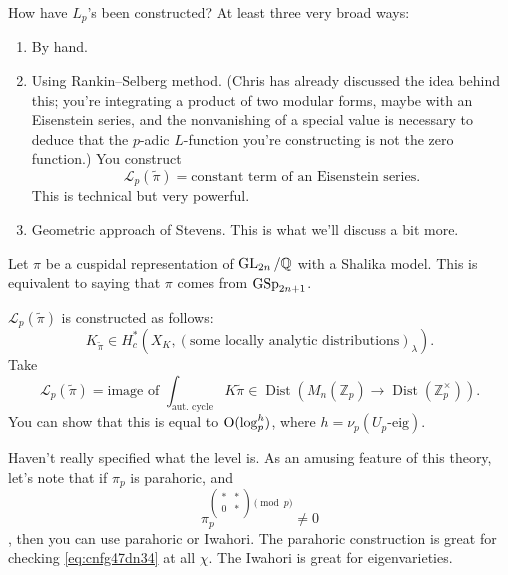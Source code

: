 \documentclass[reqno]{amsart} 
\begin{document}
How have $L_p$'s been constructed?  At least three very broad ways:
\begin{enumerate}
\item\label{enumerate:cnfg5j8bot} By hand.
\item\label{enumerate:cnfg5j8dm9} Using Rankin--Selberg method.  (Chris has already discussed the idea behind this; you're integrating a product of two modular forms, maybe with an Eisenstein series, and the nonvanishing of a special value is necessary to deduce that the $p$-adic $L$-function you're constructing is not the zero function.)  You construct
  \begin{equation*}
    \mathcal{L}_p(\tilde{\pi}) = \text{constant term of an Eisenstein series}.
  \end{equation*}
  This is technical but very powerful.
\item Geometric approach of Stevens.  This is what we'll discuss a bit more.
\end{enumerate}

Let $\pi$ be a cuspidal representation of $\operatorname{GL}_{2 n}/\mathbb{Q}$ with a Shalika model.  This is equivalent to saying that $\pi$ comes from $\operatorname{GSp}_{2 n + 1}$.

$\mathcal{L}_p(\tilde{\pi})$ is constructed as follows:
\begin{equation*}
  K_{\tilde{\pi}} \in H_c^\ast(X_K, (\text{some locally analytic distributions})_\lambda).
\end{equation*}
Take
\begin{equation*}
  \mathcal{L}_p(\tilde{\pi}) = \text{image of }
  \int_{\text{aut. cycle}} K \tilde{\pi} \in
  \operatorname{Dist}(M_n(\mathbb{Z}_p) \rightarrow \operatorname{Dist}(\mathbb{Z}_p^\times)).
\end{equation*}
You can show that this is equal to $\operatorname{O}(\log_p^h)$, where $h = \nu_p(U_p\text{-eig})$.

Haven't really specified what the level is.  As an amusing feature of this theory, let's note that if $\pi_p$ is parahoric, and
\begin{equation*}
  \pi_p^{
    \begin{pmatrix}
      \ast      & \ast \\
      0 & \ast \\
    \end{pmatrix} \pmod{p}}
  \neq 0
\end{equation*},
then you can use parahoric or Iwahori.  The parahoric construction is great for checking \eqref{eq:cnfg47dn34} at all $\chi$.  The Iwahori is great for eigenvarieties.
\end{document}

